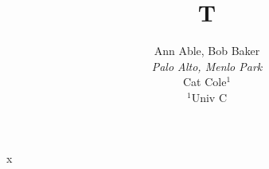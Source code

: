 \documentclass{article}
\title{T}
\author{Ann Able, Bob Baker\\ \textit{Palo Alto, Menlo Park}\\ Cat Cole$^{1}$\\ $^{1}$Univ C}
\begin{document}
\maketitle
x
\end{document}
